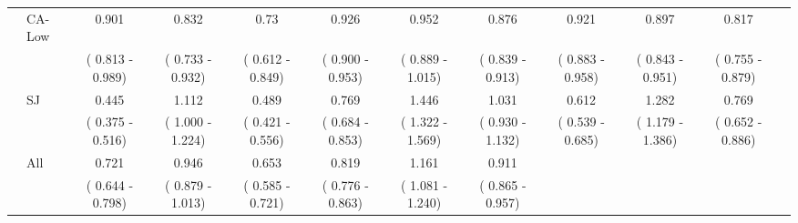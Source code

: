 \begin{table}
\begin{adjustbox}{width=\linewidth}
\begin{threeparttable}
\begin{tabular}{@{}ll|ccc|ccc|cccl@{}}
 & CA-Low & 0.901 & 0.832 & 0.73 & 0.926 & 0.952 & 0.876 & 0.921 & 0.897 & 0.817 &  \\
 &  & ( 0.813 - 0.989) & ( 0.733 - 0.932) & ( 0.612 - 0.849) & ( 0.900 - 0.953) & ( 0.889 - 1.015) & ( 0.839 - 0.913) & ( 0.883 - 0.958) & ( 0.843 - 0.951) & ( 0.755 - 0.879) &  \\ \cmidrule(lr){2-11}
 & SJ & 0.445 & 1.112 & 0.489 & 0.769 & 1.446 & 1.031 & 0.612 & 1.282 & 0.769 &  \\
 &  & ( 0.375 - 0.516) & ( 1.000 - 1.224) & ( 0.421 - 0.556) & ( 0.684 - 0.853) & ( 1.322 - 1.569) & ( 0.930 - 1.132) & ( 0.539 - 0.685) & ( 1.179 - 1.386) & ( 0.652 - 0.886) &  \\ \cmidrule(lr){2-11}
 & All & 0.721 & 0.946 & 0.653 & 0.819 & 1.161 & 0.911 &  &  &  &  \\
 &  & ( 0.644 - 0.798) & ( 0.879 - 1.013) & ( 0.585 - 0.721) & ( 0.776 - 0.863) & ( 1.081 - 1.240) & ( 0.865 - 0.957) &  &  &  &  \\ \bottomrule
\end{tabular}
\end{threeparttable}
\end{adjustbox}
\end{table}

